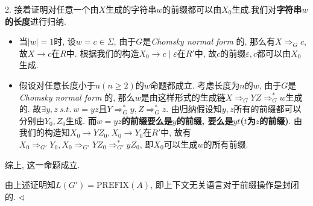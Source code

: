 \documentclass[11pt]{article}
\newenvironment{answer}[1][Answer]{\begin{trivlist}
\item[\hskip \labelsep{\bfseries\itshape#1.}\hskip \labelsep]}{\hfill$\lhd$\end{trivlist}}
\begin{document}
\begin{answer}
   2. 接着证明对任意一个由$X$生成的字符串$w$的前缀都可以由$X_0$生成.我们对\textbf{字符串$w$的长度}进行归纳.
   \begin{itemize}
    \item 当$|w| = 1$时, 设$w = c \in \Sigma$, 由于$G$是\emph{Chomsky normal form }的, 那么有$X \Rightarrow_G c$, 故$X \rightarrow c$在$R$中. 根据我们的构造$X_0 \rightarrow c \mid \varepsilon$在$R'$中, 故$c$的前缀$\varepsilon,c$都可以由$X_0$生成.
    \item 假设对任意长度小于$n(n \ge 2)$的$w$命题都成立. 考虑长度为$n$的$w$, 由于$G$是\emph{Chomsky normal form }的, 那么$w$是由这样形式的生成链$X \Rightarrow_G YZ \Rightarrow_G^* w$生成的. 故$\exists y,z ~s.t.~ w = yz$且$Y \Rightarrow_G^* y, Z \Rightarrow_G^* z$. 由归纳假设知$y,z$所有的前缀都可以分别由$Y_0,Z_0$生成. \textbf{而$w=yz$的前缀要么是$y$的前缀, 要么是$yt$($t$为$z$的前缀)}. 由我们的构造知$X_0 \rightarrow YZ_0, X_0 \rightarrow Y_0$在$R'$中, 故有$X_0 \Rightarrow_{G'} Y_0, X_0 \Rightarrow_{G'} YZ_0 \Rightarrow_{G'}^* yZ_0$, 即$X_0$可以生成$w$的所有前缀.
   \end{itemize}
   综上, 这一命题成立.

   由上述证明知$L(G') = \text{PREFIX}(A)$, 即上下文无关语言对于前缀操作是封闭的.
\end{answer}
\end{document}
